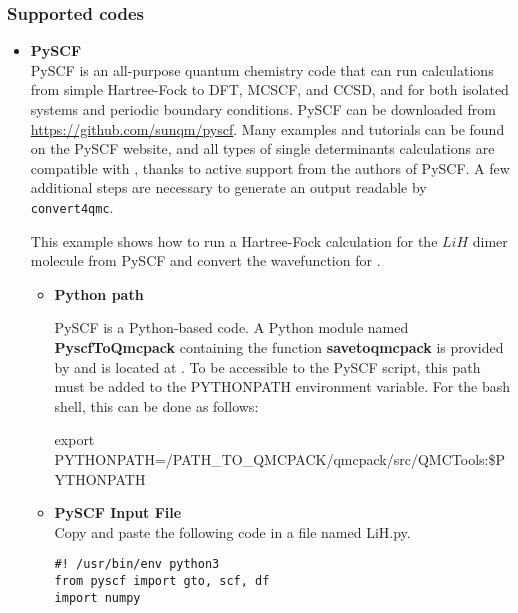 \subsubsection{Supported codes}

\begin{itemize}
\item \textbf{PySCF}\\

PySCF\cite{Sun2018} is an all-purpose quantum chemistry code that can
run calculations from simple Hartree-Fock to DFT, MCSCF, and CCSD, and
for both isolated systems and periodic boundary conditions. PySCF can
be downloaded from \url{https://github.com/sunqm/pyscf}. Many examples
and tutorials can be found on the PySCF website, and all types of
single determinants calculations are compatible with \qmcpack, thanks
to active support from the authors of PySCF. A few additional steps
are necessary to generate an output readable by \texttt{convert4qmc}.


This example shows how to run a Hartree-Fock calculation for the $LiH$
dimer molecule from PySCF and convert the wavefunction for \qmcpack.\\

\begin{itemize}
\item \textbf{Python path}\\
  \begin{sloppypar}
    PySCF is a Python-based code. A Python module named \textbf{PyscfToQmcpack} containing the function \textbf{savetoqmcpack} is provided by \qmcpack and is located at\linebreak
    .
To be accessible to the PySCF script, this path must be added to the PYTHONPATH environment variable.
For the bash shell, this can be done as follows:\\
\end{sloppypar}
\begin{shade}
 export PYTHONPATH=/PATH_TO_QMCPACK/qmcpack/src/QMCTools:\$PYTHONPATH
\end{shade}


 \item \textbf{PySCF Input File}\\
 
Copy and paste the following code in a file named LiH.py.

\begin{lstlisting}[style=Python]
#! /usr/bin/env python3
from pyscf import gto, scf, df
import numpy


\end{lstlisting}
\end{itemize}
\end{itemize}
